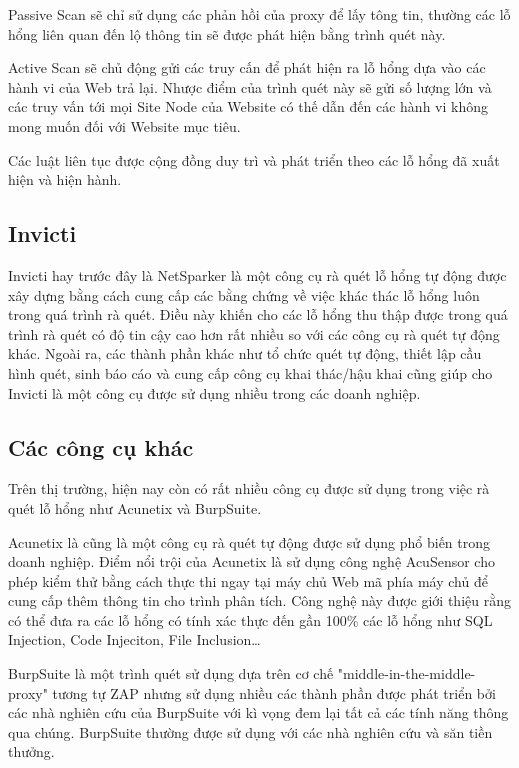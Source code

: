 \documentclass[./../main.tex]{subfiles}
\begin{document}
Passive Scan sẽ chỉ sử dụng các phản hồi của proxy để lấy tông tin, thường
các lỗ hổng liên quan đến lộ thông tin sẽ được phát hiện bằng trình quét này.

Active Scan sẽ chủ động gửi các truy cấn để phát hiện ra lỗ hổng dựa vào
các hành vi của Web trả lại. Nhược điểm của trình quét này sẽ gửi số lượng
lớn và các truy vấn tới mọi Site Node của Website có thế dẫn đến các hành vi
không mong muốn đối với Website mục tiêu.

Các luật liên tục được cộng đồng duy trì và phát triển theo các lỗ hổng
đã xuất hiện và hiện hành.

\subsection{Invicti}

Invicti hay trước đây là NetSparker là một công cụ rà quét lỗ hổng tự động
được xây dựng bằng cách cung cấp các bằng chứng về việc khác thác lỗ hổng luôn
trong quá trình rà quét. Điều này khiến cho các lỗ hổng thu thập được trong
quá trình rà quét có độ tin cậy cao hơn rất nhiều so với các công cụ
rà quét tự động khác. Ngoài ra, các thành phần khác
như tổ chức quét tự động, thiết lập cầu hình quét, sinh báo cáo và cung cấp
công cụ khai thác/hậu khai cũng giúp cho Invicti là một công cụ được sử dụng
nhiều trong các doanh nghiệp.

\subsection{Các công cụ khác}

Trên thị trường, hiện nay còn có rất nhiều công cụ được sử dụng trong việc
rà quét lỗ hổng như Acunetix và BurpSuite.

Acunetix là cũng là một công cụ rà quét tự động được sử dụng phổ biến trong
doanh nghiệp. Điểm nổi trội của Acunetix là sử dụng công nghệ AcuSensor cho
phép kiểm thử bằng cách thực thi ngay tại máy chủ Web mã phía máy chủ để cung
cấp thêm thông tin cho trình phân tích. Công nghệ này được giới thiệu rằng có
thể đưa ra các lỗ hổng có tính xác thực đến gần 100\% các lỗ hổng như SQL Injection,
Code Injeciton, File Inclusion\ldots

BurpSuite là một trình quét sử dụng dựa trên cơ chế "middle-in-the-middle-proxy"
tương tự ZAP nhưng sử dụng nhiều các thành phần được phát triển bởi
các nhà nghiên cứu của BurpSuite với kì vọng đem lại tất cả các tính năng
thông qua chúng. BurpSuite thường được sử dụng với các nhà nghiên cứu và săn
tiền thưởng.
\end{document}

